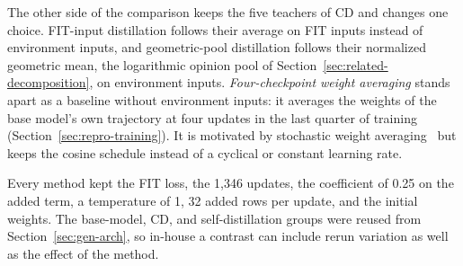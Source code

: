 The other side of the comparison keeps the five teachers of CD and
changes one choice. FIT-input distillation follows their average on
FIT inputs instead of environment inputs, and geometric-pool
distillation follows their normalized geometric mean, the logarithmic
opinion pool of Section~\ref{sec:related-decomposition}, on environment
inputs.
\emph{Four-checkpoint weight averaging} stands apart as a baseline
without environment inputs: it averages the weights of the base model's
own trajectory at four updates in the last quarter of training
(Section~\ref{sec:repro-training}). It is motivated by stochastic
weight averaging~\cite{izmailov2018averaging} but keeps the cosine
schedule instead of a cyclical or constant learning rate.

Every method kept the FIT loss, the 1,346 updates, the coefficient of
0.25 on the added term, a temperature of 1, 32 added rows per update,
and the initial weights. The base-model, CD, and self-distillation
groups were reused from Section~\ref{sec:gen-arch}, so in-house a
contrast can include rerun variation as well as the effect of the
method.

